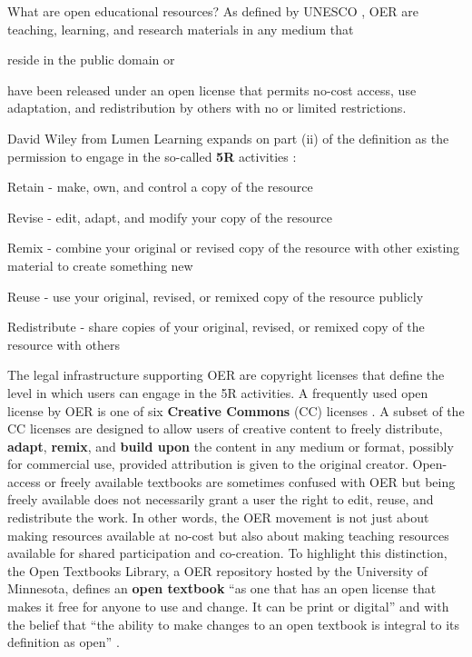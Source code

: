 \documentclass[11pt]{article}
\begin{document}
What are open educational resources?  As defined by UNESCO \cite{oerworldcongress}, OER are teaching, learning, and research materials in any medium that
\begin{compactenum}[(i)]
\item reside in the public domain or
\item have been released under an open license that permits no-cost access, use adaptation, and redistribution by others with no or limited restrictions.
\end{compactenum}
David Wiley from Lumen Learning expands on part (ii) of the definition as the permission to engage in the so-called \textbf{5R} activities \cite{wileynd}:
\begin{compactenum}[(i)]
  \item Retain - make, own, and control a copy of the resource
  \item Revise - edit, adapt, and modify your copy of the resource
  \item Remix - combine your original or revised copy of the resource with other existing material to create something new
  \item Reuse - use your original, revised, or remixed copy of the resource publicly
  \item Redistribute - share copies of your original, revised, or remixed copy of the resource with others
\end{compactenum}

The legal infrastructure supporting OER are copyright licenses that define the level in which users can engage in the 5R activities.  A frequently used open license by OER is one of six  \textbf{Creative Commons} (CC) licenses \cite{CClicenses:nd}.  A subset of the CC licenses are designed to allow users of creative content to freely distribute, \textbf{adapt}, \textbf{remix}, and \textbf{build upon} the content in any medium or format, possibly for commercial use, provided attribution is given to the original creator.  Open-access or freely available textbooks are sometimes confused with OER but being freely available does not necessarily grant a user the right to edit, reuse, and redistribute the work.  In other words, the OER movement is not just about making resources available at no-cost but also about making teaching resources available for shared participation and co-creation.  To highlight this distinction, the Open Textbooks Library, a OER repository hosted by the University of Minnesota, defines an \textbf{open textbook} ``as one that has an open license that makes it free for anyone to use and change. It can be print or digital'' and with the belief that ``the ability to make changes to an open textbook is integral to its definition as open'' \cite{opentextbooksfaq:nd}.
\end{document}
